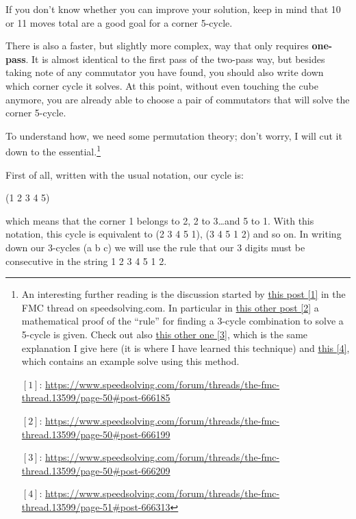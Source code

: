 \documentclass[11pt,a4paper]{book}
\begin{document}
If you don't know whether you can improve your solution, keep in mind that 10 or 11 moves total are a good goal for a corner 5-cycle.

There is also a faster, but slightly more complex, way that only requires \textbf{one-pass}. It is almost identical to the first pass of the two-pass way, but besides taking note of any commutator you have found, you should also write down which corner cycle it solves. At this point, without even touching the cube anymore, you are already able to choose a pair of commutators that will solve the corner 5-cycle.

To understand how, we need some permutation theory; don't worry, I will cut it down to the essential.\footnote{An interesting further reading is the discussion started by \href{{https://www.speedsolving.com/forum/threads/the-fmc-thread.13599/page-50\#post-666185}}{this post [1]} in the FMC thread on speedsolving.com. In particular in \href{https://www.speedsolving.com/forum/threads/the-fmc-thread.13599/page-50\#post-666199}{this other post [2]} a mathematical proof of the ``rule'' for finding a 3-cycle combination to solve a 5-cycle is given. Check out also \href{https://www.speedsolving.com/forum/threads/the-fmc-thread.13599/page-50\#post-666209}{this other one [3]}, which is the same explanation I give here (it is where I have learned this technique) and \href{https://www.speedsolving.com/forum/threads/the-fmc-thread.13599/page-51\#post-666313}{this [4]}, which contains an example solve using this method.

$[1]$: \url{https://www.speedsolving.com/forum/threads/the-fmc-thread.13599/page-50\#post-666185}

$[2]$: \url{https://www.speedsolving.com/forum/threads/the-fmc-thread.13599/page-50\#post-666199}

$[3]$: \url{https://www.speedsolving.com/forum/threads/the-fmc-thread.13599/page-50\#post-666209}

$[4]$: \url{https://www.speedsolving.com/forum/threads/the-fmc-thread.13599/page-51\#post-666313}}

First of all, written with the usual notation, our cycle is:

\begin{center}
(1 2 3 4 5)
\end{center}

which means that the corner 1 belongs to 2, 2 to 3\dots and 5 to 1. With this notation, this cycle is equivalent to (2 3 4 5 1), (3 4 5 1 2) and so on. In writing down our 3-cycles (a b c) we will use the rule that our 3 digits must be consecutive in the string 1 2 3 4 5 1 2.
\end{document}
